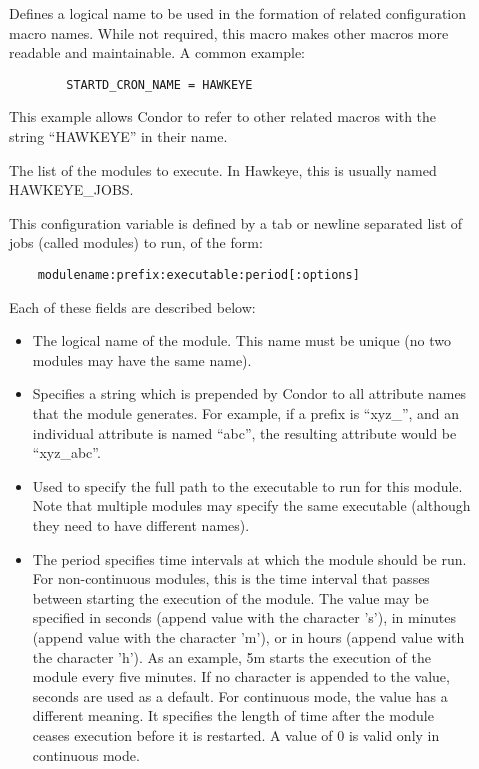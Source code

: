 \begin{description}

\item[]
\label{param:StartdCronName}
  Defines a logical name to be used in the formation of related
  configuration macro names. While
  not required, this macro makes other macros
  more readable and maintainable.  A common example:
\begin{verbatim}
        STARTD_CRON_NAME = HAWKEYE
\end{verbatim}
  This example allows Condor to refer to other related macros
  with the string ``HAWKEYE'' in their name.

\item[]
\label{param:StartdCronJobs}
  The list of the modules to execute.  In Hawkeye, this is usually
  named HAWKEYE\_JOBS.

  This configuration variable is defined by
  a tab or newline separated list of jobs (called modules) to run, of the form:
\begin{verbatim}
	modulename:prefix:executable:period[:options]
\end{verbatim}
  Each of these fields are described below:
  \begin{itemize}

    \item {} The logical name of the module.  This name
    must be unique (no two modules may have the same name).

    \item {} Specifies a string which is prepended
    by Condor to all attribute names that the module generates.  For
    example, if a prefix is ``xyz\_'', and an individual
    attribute is named ``abc'', the resulting attribute would be
    ``xyz\_abc''.

    \item {} Used to specify the full path to the
    executable to run for this module.  Note that multiple modules may
    specify the same executable (although they need to have different
    names).

    \item {} The period specifies time intervals at
    which the module should be run.
    For non-continuous modules, this
    is the time interval that passes between starting the execution
    of the module.
    The value may be specified in seconds (append value with the character 's'),
    in minutes (append value with the character 'm'),
    or in hours (append value with the character 'h').
    As an example, 5m starts the execution of the module every five minutes.
    If no character is appended to the value, seconds are used as a default.
    For continuous mode, the value has a different meaning.
    It specifies the length of time after the module ceases execution
    before it is restarted.
    A value of 0 is valid only in continuous mode.


\end{itemize}
\end{description}
